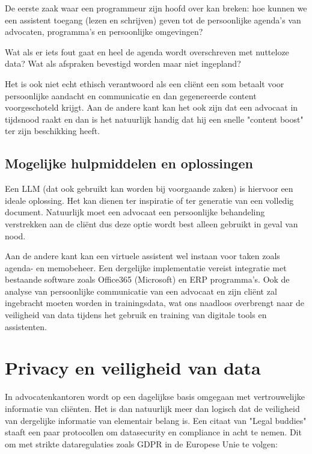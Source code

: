 De eerste zaak waar een programmeur zijn hoofd over kan breken:
hoe kunnen we een assistent toegang (lezen en schrijven) geven tot de persoonlijke agenda's van advocaten, programma's en persoonlijke omgevingen?

Wat als er iets fout gaat en heel de agenda wordt overschreven met nutteloze data?
Wat als afspraken bevestigd worden maar niet ingepland?

Het is ook niet echt ethisch verantwoord als een cliënt een som betaalt voor persoonlijke aandacht en communicatie en dan gegenereerde content voorgeschoteld krijgt.
Aan de andere kant kan het ook zijn dat een advocaat in tijdsnood raakt en dan is het natuurlijk handig dat hij een snelle "content boost" ter zijn beschikking heeft.

\subsection{Mogelijke hulpmiddelen en oplossingen}
Een LLM (dat ook gebruikt kan worden bij voorgaande zaken) is hiervoor een ideale oplossing.
Het kan dienen ter inspiratie of ter generatie van een volledig document.
Natuurlijk moet een advocaat een persoonlijke behandeling verstrekken aan de cliënt dus deze optie wordt best alleen gebruikt in geval van nood.

Aan de andere kant kan een virtuele assistent wel instaan voor taken zoals agenda- en memobeheer.
Een dergelijke implementatie vereist integratie met bestaande software zoals Office365 (Microsoft) en ERP programma's.
Ook de analyse van persoonlijke communicatie van een advocaat en zijn cliënt zal ingebracht moeten worden in trainingsdata,
wat ons naadloos overbrengt naar de veiligheid van data tijdens het gebruik en training van digitale tools en assistenten.
\newpage

\section{Privacy en veiligheid  van data}
In advocatenkantoren wordt op een dagelijkse basis omgegaan met vertrouwelijke informatie van cliënten.
Het is dan natuurlijk meer dan logisch dat de veiligheid van dergelijke informatie van elementair belang is.
Een citaat van "Legal buddies" staaft een paar protocollen om datasecurity en compliance in acht te nemen.
Dit om met strikte dataregulaties zoals GDPR in de Europese Unie te volgen:

